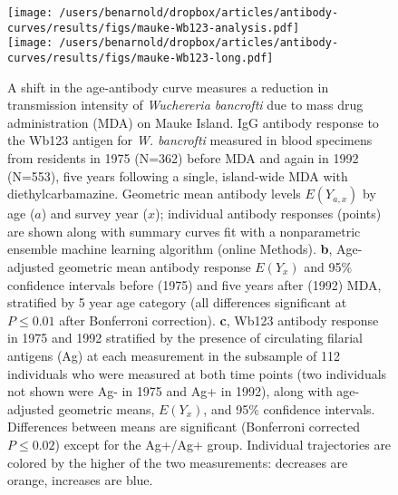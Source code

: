 \documentclass[11pt]{article}
\begin{document}
\begin{figure}[htbp]
\begin{center}
\texttt{[image: /users/benarnold/dropbox/articles/antibody-curves/results/figs/mauke-Wb123-analysis.pdf]} \\
\texttt{[image: /users/benarnold/dropbox/articles/antibody-curves/results/figs/mauke-Wb123-long.pdf]}
\begin{minipage}{\textwidth}
\caption{A shift in the age-antibody curve measures a reduction in transmission intensity of \textit{Wuchereria bancrofti} due to mass drug administration (MDA) on Mauke Island.  IgG antibody response to the Wb123 antigen for \textit{W. bancrofti} measured in blood specimens from residents in 1975 (N=362) before MDA and again in 1992 (N=553), five years following a single, island-wide MDA with diethylcarbamazine. Geometric mean antibody levels $E(Y_{a,x})$ by age ($a$) and survey year ($x$); individual antibody responses (points) are shown along with summary curves fit with a nonparametric ensemble machine learning algorithm (online Methods). \textbf{b}, Age-adjusted geometric mean antibody response $E(Y_{x})$ and 95\% confidence intervals before (1975) and five years after (1992) MDA, stratified by 5 year age category (all differences significant at $P\leq0.01$ after Bonferroni correction). \textbf{c}, Wb123 antibody response in 1975 and 1992 stratified by the presence of circulating filarial antigens (Ag) at each measurement in the subsample of 112 individuals who were measured at both time points (two individuals not shown were Ag- in 1975 and Ag+ in 1992), along with age-adjusted geometric means, $E(Y_{x})$, and 95\% confidence intervals. Differences between means are significant (Bonferroni corrected $P\leq0.02$) except for the Ag+/Ag+ group. Individual trajectories are colored by the higher of the two measurements: decreases are orange, increases are blue. }
\label{fig:mauke}
\end{minipage}
\end{center}
\end{figure}

\end{document}
